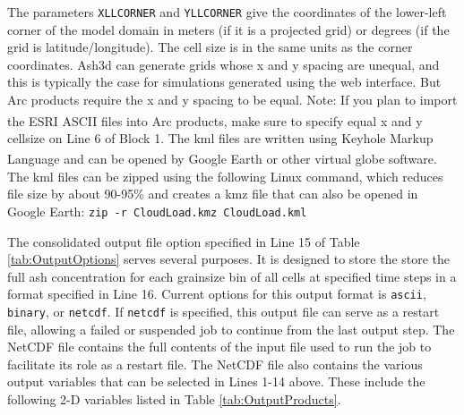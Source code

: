 The parameters \texttt{XLLCORNER} and \texttt{YLLCORNER} give the coordinates
of the lower-left
corner of the model domain in meters (if it is a projected grid) or degrees (if
the grid is latitude/longitude). The cell size is in the same units as the corner
coordinates. 
Ash3d can generate grids whose x and y spacing are unequal, and this is
typically the case for simulations generated using the web interface. But Arc
products require the x and y spacing to be equal. Note: If you plan to import
the ESRI\textsuperscript{\tiny\textregistered} ASCII files into
Arc products, make sure to specify equal x and y cellsize
on Line 6 of Block 1.
The kml files are written using Keyhole Markup Language and can be opened by
Google Earth\textsuperscript{\tiny\textregistered} or other virtual globe
software. The kml files can be zipped using the
following Linux command, which reduces file size by about 90-95\% and creates a
kmz file that can also be opened in Google Earth:
\texttt{zip -r CloudLoad.kmz CloudLoad.kml}

The consolidated output file option specified in Line 15 of Table \ref{tab:OutputOptions}
serves several purposes. It is designed to store the store the full ash concentration
for each grainsize bin
of all cells at specified time steps in a format specified in Line 16. Current options
for this output format is \texttt{ascii}, \texttt{binary}, or \texttt{netcdf}.
If \texttt{netcdf}
is specified, this output file can serve as a restart file, allowing a failed or
suspended job to continue from the last output step. The NetCDF file contains
the full contents of the input file used to run the job to facilitate its
role as a restart file.
The NetCDF file also contains the various output variables that can be selected
in Lines 1-14 above. These include the following 2-D variables listed in
Table \ref{tab:OutputProducts}.

